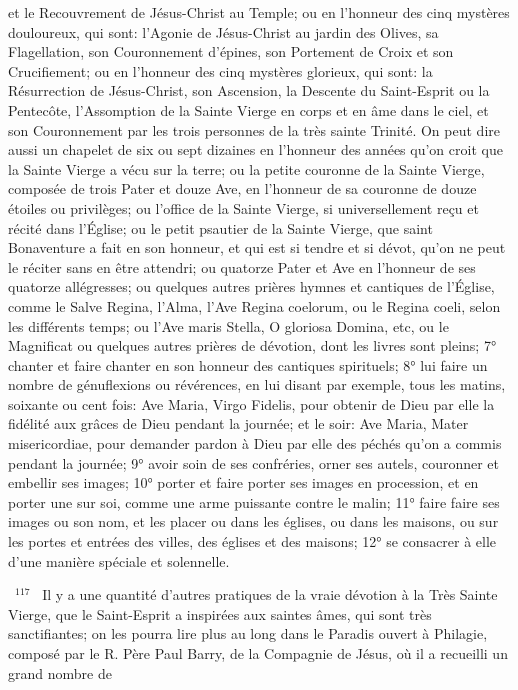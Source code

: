 \documentclass[paper=a5,pagesize=pdftex,fontsize=15pt,headinclude=on,twoside=off]{scrbook}
\newcommand{\negphantom}[1]{\settowidth{\dimen0}{#1}\hspace*{-\dimen0}}
\newcommand{\versenb}[1]{\par \vspace{10pt}~\negphantom{~${}^{#1}$~}${}^{#1}$~}
\begin{document}
et le Recouvrement de Jésus-Christ au Temple; ou en l'honneur des cinq mystères douloureux, qui sont: l'Agonie
de Jésus-Christ au jardin des Olives, sa Flagellation, son Couronnement d'épines, son Portement de Croix et son
Crucifiement; ou en l'honneur des cinq mystères glorieux, qui sont: la Résurrection de Jésus-Christ, son
Ascension, la Descente du Saint-Esprit ou la Pentecôte, l'Assomption de la Sainte Vierge en corps et en âme dans
le ciel, et son Couronnement par les trois personnes de la très sainte Trinité. On peut dire aussi un chapelet de six
ou sept dizaines en l'honneur des années qu'on croit que la Sainte Vierge a vécu sur la terre; ou la petite couronne
de la Sainte Vierge, composée de trois Pater et douze Ave, en l'honneur de sa couronne de douze étoiles ou
privilèges; ou l'office de la Sainte Vierge, si universellement reçu et récité dans l'Église; ou le petit psautier de la
Sainte Vierge, que saint Bonaventure a fait en son honneur, et qui est si tendre et si dévot, qu'on ne peut le réciter
sans en être attendri; ou quatorze Pater et Ave en l'honneur de ses quatorze allégresses; ou quelques autres
prières hymnes et cantiques de l'Église, comme le Salve Regina, l'Alma, l'Ave Regina coelorum, ou le Regina
coeli, selon les différents temps; ou l'Ave maris Stella, O gloriosa Domina, etc, ou le Magnificat ou quelques autres
prières de dévotion, dont les livres sont pleins; 7° chanter et faire chanter en son honneur des cantiques spirituels;
8° lui faire un nombre de génuflexions ou révérences, en lui disant par exemple, tous les matins, soixante ou cent
fois: Ave Maria, Virgo Fidelis, pour obtenir de Dieu par elle la fidélité aux grâces de Dieu pendant la journée; et le
soir: Ave Maria, Mater misericordiae, pour demander pardon à Dieu par elle des péchés qu'on a commis pendant
la journée; 9° avoir soin de ses confréries, orner ses autels, couronner et embellir ses images; 10° porter et faire
porter ses images en procession, et en porter une sur soi, comme une arme puissante contre le malin; 11° faire
faire ses images ou son nom, et les placer ou dans les églises, ou dans les maisons, ou sur les portes et entrées
des villes, des églises et des maisons; 12° se consacrer à elle d'une manière spéciale et solennelle.
\versenb{117} Il y a une quantité d'autres pratiques de la vraie dévotion à la Très Sainte Vierge, que le Saint-Esprit a
inspirées aux saintes âmes, qui sont très sanctifiantes; on les pourra lire plus au long dans le Paradis ouvert à
Philagie, composé par le R. Père Paul Barry, de la Compagnie de Jésus, où il a recueilli un grand nombre de
\end{document}
